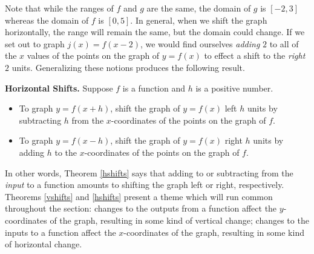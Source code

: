 Note that while the ranges of $f$ and $g$ are the same, the domain of $g$ is $[-2,3]$ whereas the domain of $f$ is $[0,5]$.  In general, when we shift the graph horizontally, the range will remain the same, but the domain could change.  If we set out to graph $j(x) = f(x-2)$, we would find ourselves \textit{adding} $2$ to all of the $x$ values of the points on the graph of $y=f(x)$ to effect a shift to the \emph{right} $2$ units. Generalizing these notions produces the following result.

\smallskip

\colorbox{ResultColor}{\bbm


\begin{thm} \label{hshifts}\textbf{Horizontal Shifts.}  Suppose $f$ is a function and $h$ is a positive number. 

\begin{itemize}

\item To graph $y=f(x+h)$, shift the graph of $y=f(x)$ left $h$ units by subtracting $h$ from the $x$-coordinates of the points on the graph of $f$.

\item To graph $y=f(x-h)$, shift the graph of $y=f(x)$ right $h$ units by adding $h$ to the $x$-coordinates of the points on the graph of $f$.

\end{itemize}

\end{thm}

\ebm}

\smallskip

In other words,  Theorem \ref{hshifts} says that adding to or subtracting from the  \textit{input} to a function amounts to shifting the graph left or right, respectively.  Theorems \ref{vshifts} and \ref{hshifts} present a theme which will run common throughout the section:  changes to the outputs from a function affect the $y$-coordinates of the graph, resulting in some kind of vertical change;  changes to the inputs to a function affect the $x$-coordinates of the graph, resulting in some kind of horizontal change.

